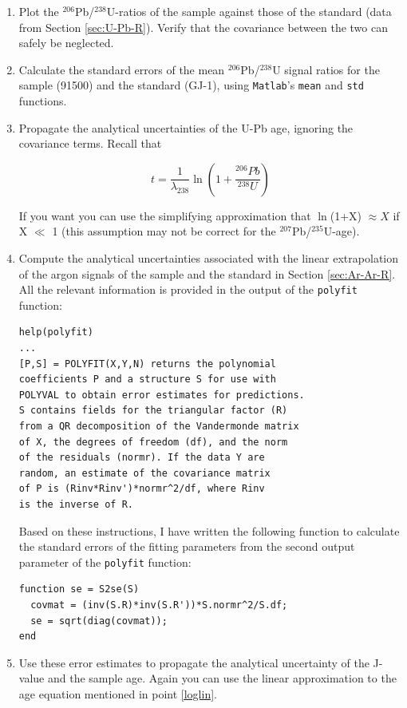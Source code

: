 \documentclass{book}
\begin{document}
\begin{enumerate}

\item Plot the $^{206}$Pb/$^{238}$U-ratios of the sample against those
  of the standard (data from Section \ref{sec:U-Pb-R}).  Verify that
  the covariance between the two can safely be neglected.

\item Calculate the standard errors of the mean $^{206}$Pb/$^{238}$U
  signal ratios for the sample (91500) and the standard (GJ-1), using
  {\tt Matlab}'s {\tt mean} and {\tt std} functions.

\item Propagate the analytical uncertainties of the U-Pb age, ignoring
  the covariance terms. Recall that 

$$ t = \frac{1}{\lambda_{238}}\ln\left(1 + \frac{{}^{206}Pb}{{}^{238}U}\right) $$

If you want you can use the simplifying approximation that $\ln$(1+X)
$\approx X$ if X $\ll$ 1 (this assumption may not be correct for the
$^{207}$Pb/$^{235}$U-age). \label{loglin}

\item Compute the analytical uncertainties associated with the linear
  extrapolation of the argon signals of the sample and the standard in
  Section \ref{sec:Ar-Ar-R}. All the relevant information is provided
  in the output of the {\tt polyfit} function:

\begin{verbatim}
help(polyfit)
...
[P,S] = POLYFIT(X,Y,N) returns the polynomial
coefficients P and a structure S for use with 
POLYVAL to obtain error estimates for predictions.  
S contains fields for the triangular factor (R)
from a QR decomposition of the Vandermonde matrix 
of X, the degrees of freedom (df), and the norm 
of the residuals (normr). If the data Y are 
random, an estimate of the covariance matrix 
of P is (Rinv*Rinv')*normr^2/df, where Rinv 
is the inverse of R.
\end{verbatim}

Based on these instructions, I have written the following function to
calculate the standard errors of the fitting parameters from the
second output parameter of the {\tt polyfit} function:

\begin{verbatim}
function se = S2se(S)
  covmat = (inv(S.R)*inv(S.R'))*S.normr^2/S.df;
  se = sqrt(diag(covmat));
end
\end{verbatim}

\item Use these error estimates to propagate the analytical
  uncertainty of the J-value and the sample age. Again you can use the
  linear approximation to the age equation mentioned in point
  \ref{loglin}.

\end{enumerate}
\end{document}
